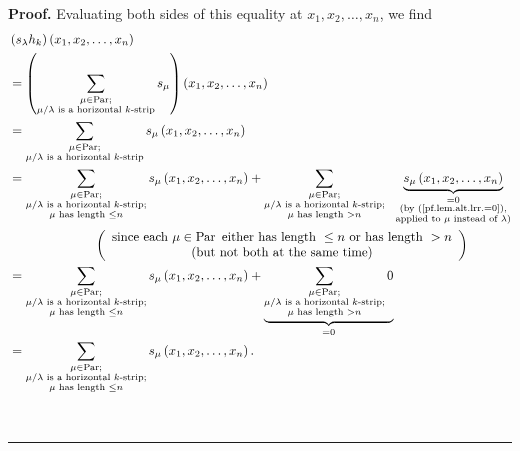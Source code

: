 \documentclass[numbers=enddot,12pt,final,onecolumn,notitlepage]{scrartcl}%
\theoremstyle{definition}
\newenvironment{proof}[1][Proof]{\noindent\textbf{#1.} }{\ \rule{0.5em}{0.5em}}
\let\sumnonlimits\sum
\renewcommand{\sum}{\sumnonlimits\limits}
\newenvironment{verlong}{}{}
\begin{document}
\begin{proof}
\begin{verlong}
Evaluating both sides of this equality at $x_{1},x_{2},\ldots,x_{n}$, we find%
\begin{align*}
&  \left(  s_{\lambda}h_{k}\right)  \left(  x_{1},x_{2},\ldots,x_{n}\right) \\
&  =\left(  \sum_{\substack{\mu\in\operatorname*{Par};\\\mu/\lambda\text{ is a
horizontal }k\text{-strip}}}s_{\mu}\right)  \left(  x_{1},x_{2},\ldots
,x_{n}\right) \\
&  =\sum_{\substack{\mu\in\operatorname*{Par};\\\mu/\lambda\text{ is a
horizontal }k\text{-strip}}}s_{\mu}\left(  x_{1},x_{2},\ldots,x_{n}\right) \\
&  =\sum_{\substack{\mu\in\operatorname*{Par};\\\mu/\lambda\text{ is a
horizontal }k\text{-strip;}\\\mu\text{ has length }\leq n}}s_{\mu}\left(
x_{1},x_{2},\ldots,x_{n}\right)  +\sum_{\substack{\mu\in\operatorname*{Par}%
;\\\mu/\lambda\text{ is a horizontal }k\text{-strip;}\\\mu\text{ has length
}>n}}\ \ \underbrace{s_{\mu}\left(  x_{1},x_{2},\ldots,x_{n}\right)
}_{\substack{=0\\\text{(by (\ref{pf.lem.alt.lrr.=0}),}\\\text{applied to }%
\mu\text{ instead of }\lambda\text{)}}}\\
&  \ \ \ \ \ \ \ \ \ \ \ \ \ \ \ \ \ \ \ \ \left(
\begin{array}
[c]{c}%
\text{since each }\mu\in\operatorname*{Par}\text{ either has length }\leq
n\text{ or has length }>n\\
\text{(but not both at the same time)}%
\end{array}
\right) \\
&  =\sum_{\substack{\mu\in\operatorname*{Par};\\\mu/\lambda\text{ is a
horizontal }k\text{-strip;}\\\mu\text{ has length }\leq n}}s_{\mu}\left(
x_{1},x_{2},\ldots,x_{n}\right)  +\underbrace{\sum_{\substack{\mu
\in\operatorname*{Par};\\\mu/\lambda\text{ is a horizontal }k\text{-strip;}%
\\\mu\text{ has length }>n}}0}_{=0}\\
&  =\sum_{\substack{\mu\in\operatorname*{Par};\\\mu/\lambda\text{ is a
horizontal }k\text{-strip;}\\\mu\text{ has length }\leq n}}s_{\mu}\left(
x_{1},x_{2},\ldots,x_{n}\right)  .
\end{align*}


\end{verlong}
\end{proof}
\end{document}
